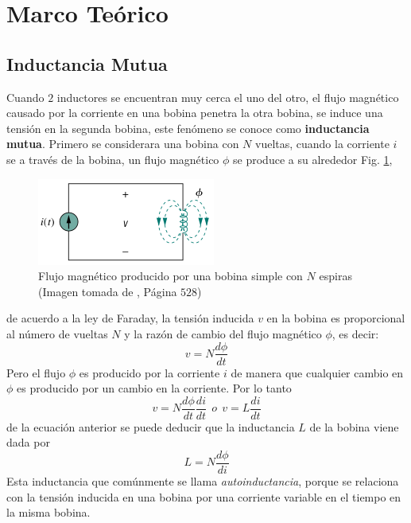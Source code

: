\documentclass[twocolumn]{IEEEtran}
\begin{document}
\section{Marco Teórico}
\subsection{Inductancia Mutua}
\noindent
Cuando $2$ inductores se encuentran muy cerca el uno del otro, el flujo magnético causado por la corriente en una bobina penetra la otra bobina, se induce una tensión en la segunda bobina, este fenómeno se conoce como \textbf{inductancia mutua}. Primero se considerara una bobina con $N$ vueltas, cuando la corriente $i$ se a través de la bobina, un flujo magnético $\phi$ se produce a su alrededor Fig. \ref{fig1},
\begin{figure}[H]
	\centering
		\includegraphics[scale=0.6]{flujomagnetico.png}
	\caption{Flujo magnético producido por una bobina simple con $N$ espiras (Imagen tomada de \cite{sadiku}, Página $528$)}
	\label{fig1}
\end{figure}
\noindent
de acuerdo a la ley de Faraday, la tensión inducida $v$ en la bobina es proporcional al número de vueltas $N$ y la razón de cambio del flujo magnético $\phi$, es decir:
\begin{equation}
 v = N \frac{d \phi}{d t}
\label{ecu1}
\end{equation}
\noindent
Pero el flujo $\phi$ es producido por la corriente $i$ de manera que cualquier cambio en $\phi$ es producido por un cambio en la corriente. Por lo tanto
\begin{equation}
 v = N \frac{d \phi}{d t}\frac{d i}{d t}\ \ o\ \ v = L \frac{d i}{d t}
\label{ecu2}
\end{equation}
\noindent
de la ecuación anterior se puede deducir que la inductancia $L$ de la bobina viene dada por
\begin{equation}
 L = N \frac{d \phi}{d i}
\label{ecu3}
\end{equation}
\noindent
Esta inductancia que comúnmente se llama \textit{autoinductancia}, porque se relaciona con la tensión inducida en una bobina por una corriente variable en el tiempo en la misma bobina.\\\\
\end{document}
